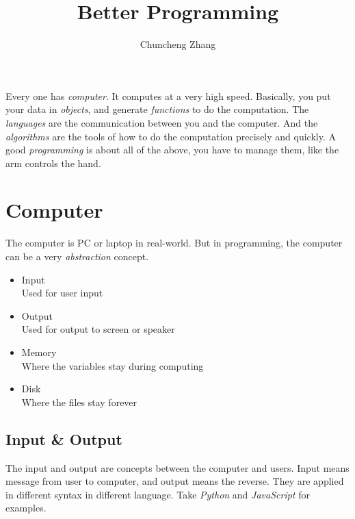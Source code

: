 

\title{Better Programming}
\author{Chuncheng Zhang}



\maketitle

\abstract
Every one has \emph{computer}.
It computes at a very high speed.
Basically, you put your data in \emph{objects}, and generate \emph{functions} to do the computation.
The \emph{languages} are the communication between you and the computer.
And the \emph{algorithms} are the tools of how to do the computation precisely and quickly.
A good \emph{programming} is about all of the above,
you have to manage them, like the arm controls the hand.

\tableofcontents

\newpage
\section{Computer}

The computer is PC or laptop in real-world.
But in programming, the computer can be a very \emph{abstraction} concept.
\begin{itemize}
    \item Input \\ Used for user input
    \item Output \\ Used for output to screen or speaker
    \item Memory \\ Where the variables stay during computing
    \item Disk \\ Where the files stay forever
\end{itemize}

\subsection{Input \& Output}

The input and output are concepts between the computer and users.
Input means message from user to computer, and output means the reverse.
They are applied in different syntax in different language.
Take \emph{Python} and \emph{JavaScript} for examples.



